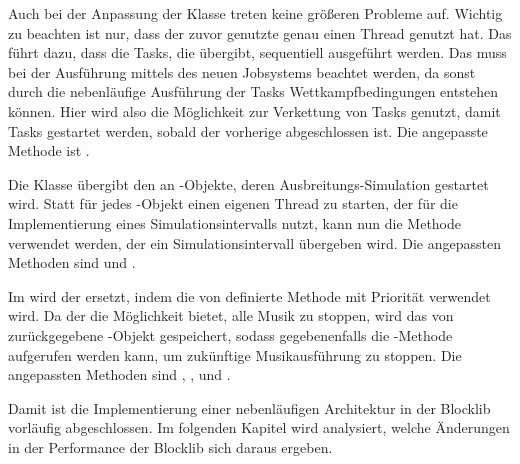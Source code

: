 Auch bei der Anpassung der Klasse  treten keine größeren Probleme auf. Wichtig zu beachten ist nur, dass der zuvor genutzte  genau einen Thread genutzt hat. Das führt dazu, dass die Tasks, die  übergibt, sequentiell ausgeführt werden. Das muss bei der Ausführung mittels des neuen Jobsystems beachtet werden, da sonst durch die nebenläufige Ausführung der Tasks Wettkampfbedingungen entstehen können. Hier wird also die Möglichkeit zur Verkettung von Tasks genutzt, damit Tasks gestartet werden, sobald der vorherige abgeschlossen ist. Die angepasste Methode ist .

Die Klasse  übergibt den  an -Objekte, deren Ausbreitungs-Simulation gestartet wird. Statt für jedes -Objekt einen eigenen Thread zu starten, der  für die Implementierung eines Simulationsintervalls nutzt, kann nun die Methode  verwendet werden, der ein Simulationsintervall übergeben wird. Die angepassten Methoden sind  und .

Im  wird der  ersetzt, indem die von  definierte Methode  mit Priorität  verwendet wird. Da der  die Möglichkeit bietet, alle Musik zu stoppen, wird das von  zurückgegebene -Objekt gespeichert, sodass gegebenenfalls die -Methode aufgerufen werden kann, um zukünftige Musikausführung zu stoppen. Die angepassten Methoden sind , ,  und .

Damit ist die Implementierung einer nebenläufigen Architektur in der Blocklib vorläufig abgeschlossen. Im folgenden Kapitel wird analysiert, welche Änderungen in der Performance der Blocklib sich daraus ergeben.